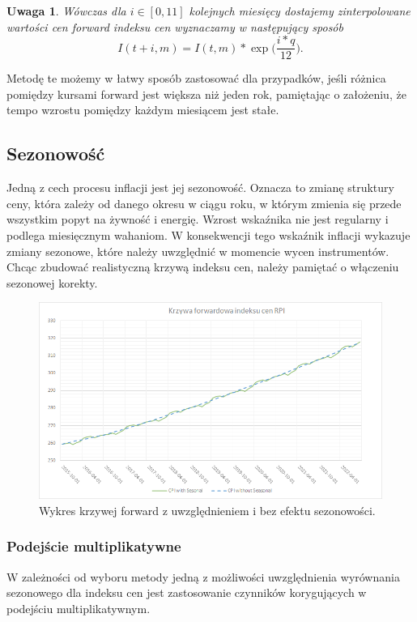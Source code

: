 \documentclass{mini}
\theoremstyle{mythstyle}
\newtheorem{Uwaga}{Uwaga}[chapter]
\begin{document}
	\begin{Uwaga}
		Wówczas dla $i \in [0,11]$ kolejnych miesięcy dostajemy zinterpolowane wartości cen forward indeksu cen wyznaczamy w następujący sposób
		\begin{equation}
		I(t+i,m) = I(t,m) * \exp\bigg(\frac{i*q}{12}\bigg).
		\end{equation}
	\end{Uwaga}
	
	Metodę te możemy w łatwy sposób zastosować dla przypadków, jeśli różnica pomiędzy kursami forward jest większa niż jeden rok, pamiętając o założeniu, że tempo wzrostu pomiędzy każdym miesiącem jest stałe.
	
	\subsection{Sezonowość}
	
	Jedną z cech procesu inflacji jest jej sezonowość. Oznacza to zmianę struktury ceny, która zależy od danego okresu w ciągu roku, w którym zmienia się przede wszystkim popyt na żywność i energię. Wzrost wskaźnika nie jest regularny i podlega miesięcznym wahaniom. W konsekwencji tego wskaźnik inflacji wykazuje zmiany sezonowe, które należy uwzględnić w momencie wycen instrumentów. Chcąc zbudować realistyczną krzywą indeksu cen, należy pamiętać o włączeniu sezonowej korekty.

	\begin{figure} [!h]
		\centering
		\includegraphics[scale=0.75]{graphics/rpi.png}
		\caption{Wykres krzywej forward z uwzględnieniem i bez efektu sezonowości.}
	\end{figure}
		
	\subsubsection*{Podejście multiplikatywne}
		W zależności od wyboru metody jedną z możliwości uwzględnienia wyrównania sezonowego dla indeksu cen jest zastosowanie czynników korygujących w podejściu multiplikatywnym.
		
\end{document}
